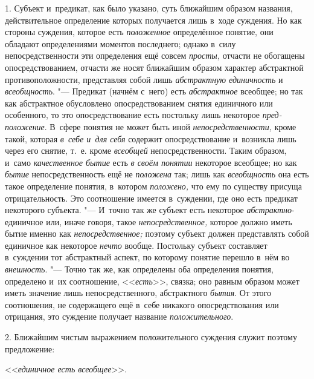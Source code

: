 1. Субъект и~предикат, как было указано, суть ближайшим образом названия,
действительное определение которых получается лишь в~ходе суждения. Но как
стороны суждения, которое есть {\em положенное} определённое понятие, они
обладают определениями моментов последнего; однако в~силу непосредственности
эти определения ещё совсем {\em просты,} отчасти не обогащены
опосредствованием, отчасти же носят ближайшим образом характер абстрактной
противоположности, представляя собой лишь {\em абстрактную единичность} и
{\em всеобщность}. "--- Предикат (начнём с~него) есть {\em абстрактное}
всеобщее; но так как абстрактное обусловлено опосредствованием снятия
единичного или особенного, то это опосредствование есть постольку лишь
некоторое {\em пред-положение}. В~сфере понятия не может быть иной
{\em непосредственности,} кроме такой, которая {\em в~себе и~для себя} содержит
опосредствование и~возникла лишь через его снятие, т.~е. кроме {\em всеобщей}
непосредственности. Таким образом, и~само {\em качественное бытие} есть {\em в
своём понятии} некоторое всеобщее; но как {\em бытие} непосредственность ещё не
{\em положена} так; лишь как {\em всеобщность} она есть такое определение
понятия, в~котором {\em положено,} что ему по существу присуща отрицательность.
Это соотношение имеется в~суждении, где оно есть предикат некоторого субъекта.
"--- И~точно так же субъект есть некоторое {\em абстрактно}-единичное или,
иначе говоря, такое {\em непосредственное,} которое должно иметь бытие именно
как {\em непосредственное;} поэтому субъект должен представлять собой единичное
как некоторое {\em нечто} вообще. Постольку субъект составляет в~суждении тот
абстрактный аспект, по которому понятие перешло в~нём во {\em внешность}. "---
Точно так же, как определены оба определения понятия, определено и~их
соотношение, <<{\em есть}>>, связка; оно равным образом может иметь значение
лишь непосредственного, абстрактного {\em бытия}. От этого соотношения, не
содержащего ещё в~себе никакого опосредствования или отрицания, это суждение
получает название {\em положительного}.

2. Ближайшим чистым выражением положительного суждения служит
поэтому предложение:

<<{\em единичное есть всеобщее}>>.

